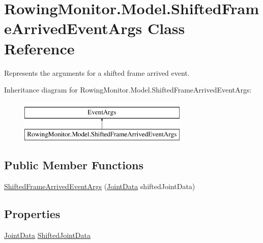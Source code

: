 \hypertarget{class_rowing_monitor_1_1_model_1_1_shifted_frame_arrived_event_args}{}\section{Rowing\+Monitor.\+Model.\+Shifted\+Frame\+Arrived\+Event\+Args Class Reference}
\label{class_rowing_monitor_1_1_model_1_1_shifted_frame_arrived_event_args}


Represents the arguments for a shifted frame arrived event.  


Inheritance diagram for Rowing\+Monitor.\+Model.\+Shifted\+Frame\+Arrived\+Event\+Args\+:\begin{figure}[H]
\begin{center}
\leavevmode
\includegraphics[height=2.000000cm]{class_rowing_monitor_1_1_model_1_1_shifted_frame_arrived_event_args}
\end{center}
\end{figure}
\subsection*{Public Member Functions}
\begin{DoxyCompactItemize}
\item 
\hyperlink{class_rowing_monitor_1_1_model_1_1_shifted_frame_arrived_event_args_a7ea2f2cc785f346a8fc51e770352ef2c}{Shifted\+Frame\+Arrived\+Event\+Args} (\hyperlink{struct_rowing_monitor_1_1_model_1_1_util_1_1_joint_data}{Joint\+Data} shifted\+Joint\+Data)
\end{DoxyCompactItemize}
\subsection*{Properties}
\begin{DoxyCompactItemize}
\item 
\hyperlink{struct_rowing_monitor_1_1_model_1_1_util_1_1_joint_data}{Joint\+Data} \hyperlink{class_rowing_monitor_1_1_model_1_1_shifted_frame_arrived_event_args_a668747182e00705fcaef8d16320ce730}{Shifted\+Joint\+Data}
\end{DoxyCompactItemize}


